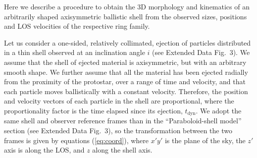 \documentclass[12pt]{mythesis}
\begin{document}





Here we describe a procedure to obtain the 3D morphology and kinematics of an arbitrarily shaped axisymmetric ballistic shell from the observed sizes, positions and LOS velocities of the respective ring family. 



Let us consider a one-sided, relatively collimated, ejection of particles distributed in a thin shell observed at an inclination angle $i$ (see Extended Data Fig.~3). We assume that the shell of ejected material is axisymmetric, but with an arbitrary smooth shape. We further assume that all the material has been ejected radially from the proximity of the protostar, over a range of time and velocity, and that each particle moves ballistically with a constant velocity. Therefore, the position and velocity vectors of each particle in the shell are proportional, where the proportionality factor is the time elapsed since its ejection, $t_\mathrm{dyn}$. We adopt the same shell and observer reference frames than in the ``Paraboloid-shell model'' section (see Extended Data Fig.~3), so the transformation between the two frames is given by equations (\ref{eq:coord}), where $x'y'$ is the plane of the sky, the $z'$ axis is along the LOS, and $z$ along 
 the shell axis.
\end{document}
